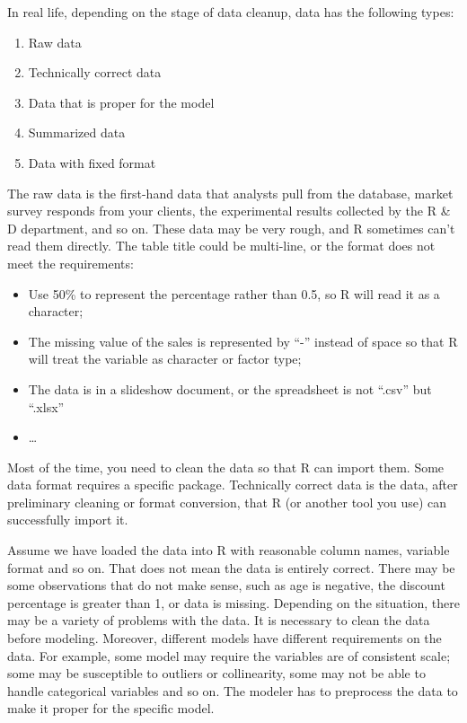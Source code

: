 \documentclass[
  12pt,
]{krantz}
\providecommand{\tightlist}{%
  \setlength{\itemsep}{0pt}\setlength{\parskip}{0pt}}
\begin{document}
In real life, depending on the stage of data cleanup, data has the following types:

\begin{enumerate}
\def\labelenumi{\arabic{enumi}.}
\tightlist
\item
  Raw data
\item
  Technically correct data
\item
  Data that is proper for the model
\item
  Summarized data
\item
  Data with fixed format
\end{enumerate}

The raw data is the first-hand data that analysts pull from the database, market survey responds from your clients, the experimental results collected by the R \& D department, and so on. These data may be very rough, and R sometimes can't read them directly. The table title could be multi-line, or the format does not meet the requirements:

\begin{itemize}
\tightlist
\item
  Use 50\% to represent the percentage rather than 0.5, so R will read it as a character;
\item
  The missing value of the sales is represented by ``-'' instead of space so that R will treat the variable as character or factor type;
\item
  The data is in a slideshow document, or the spreadsheet is not ``.csv'' but ``.xlsx''
\item
  \ldots{}
\end{itemize}

Most of the time, you need to clean the data so that R can import them. Some data format requires a specific package. Technically correct data is the data, after preliminary cleaning or format conversion, that R (or another tool you use) can successfully import it.

Assume we have loaded the data into R with reasonable column names, variable format and so on. That does not mean the data is entirely correct. There may be some observations that do not make sense, such as age is negative, the discount percentage is greater than 1, or data is missing. Depending on the situation, there may be a variety of problems with the data. It is necessary to clean the data before modeling. Moreover, different models have different requirements on the data. For example, some model may require the variables are of consistent scale; some may be susceptible to outliers or collinearity, some may not be able to handle categorical variables and so on. The modeler has to preprocess the data to make it proper for the specific model.
\end{document}
